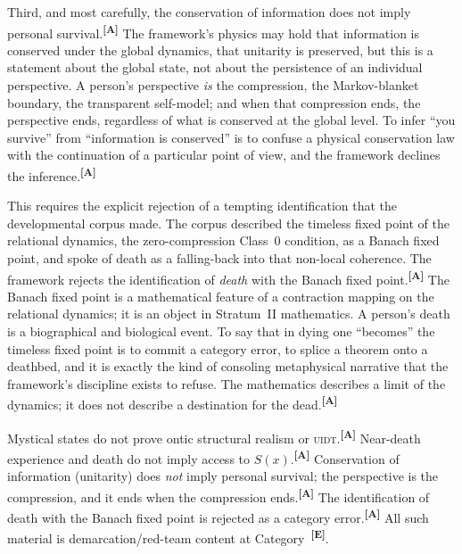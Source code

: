 \documentclass[12pt,a4paper,twoside]{article}
\theoremstyle{plain}
\theoremstyle{definition}
\theoremstyle{remark}
\newcommand{\UIDT}{\textsc{uidt}}
\newcommand{\catmark}[1]{\textsuperscript{\textsf{\textbf{[#1]}}}}
\begin{document}
Third, and most carefully, the conservation of information does not imply personal survival.\catmark{A} The framework's physics may hold that information is conserved under the global dynamics, that unitarity is preserved, but this is a statement about the global state, not about the persistence of an individual perspective. A person's perspective \emph{is} the compression, the Markov-blanket boundary, the transparent self-model; and when that compression ends, the perspective ends, regardless of what is conserved at the global level. To infer ``you survive'' from ``information is conserved'' is to confuse a physical conservation law with the continuation of a particular point of view, and the framework declines the inference.\catmark{A}

This requires the explicit rejection of a tempting identification that the developmental corpus made. The corpus described the timeless fixed point of the relational dynamics, the zero-compression Class~0 condition, as a Banach fixed point, and spoke of death as a falling-back into that non-local coherence. The framework rejects the identification of \emph{death} with the Banach fixed point.\catmark{A} The Banach fixed point is a mathematical feature of a contraction mapping on the relational dynamics; it is an object in Stratum~II mathematics. A person's death is a biographical and biological event. To say that in dying one ``becomes'' the timeless fixed point is to commit a category error, to splice a theorem onto a deathbed, and it is exactly the kind of consoling metaphysical narrative that the framework's discipline exists to refuse. The mathematics describes a limit of the dynamics; it does not describe a destination for the dead.\catmark{A}

\begin{governancebox}
Mystical states do not prove ontic structural realism or \UIDT.\catmark{A} Near-death experience and death do not imply access to $S(x)$.\catmark{A} Conservation of information (unitarity) does \emph{not} imply personal survival; the perspective is the compression, and it ends when the compression ends.\catmark{A} The identification of death with the Banach fixed point is rejected as a category error.\catmark{A} All such material is demarcation/red-team content at Category~\catmark{E}.
\end{governancebox}
\end{document}
